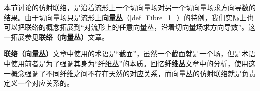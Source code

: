 本节讨论的仿射联络，是沿着流形上一个切向量场对另一个切向量场求方向导数的结果。由于切向量场只是流形上\textbf{向量丛}（\autoref{def_Fibre_1}~）的特例，我们实际上也可以把联络的概念拓展到“对流形上的任意向量丛，沿着切向量场求方向导数”。这一拓展参见\textbf{联络（向量丛）}文章。

\textbf{联络（向量丛）}文章中使用的术语是“截面”，虽然一个截面就是一个场，但是术语中使用前者是为了强调其身为“纤维丛”的本质。回忆\textbf{纤维丛}文章中的分析，使用这一概念强调了不同纤维之间不存在天然的对应关系，而向量丛的仿射联络就是负责定义一个对应关系的。



